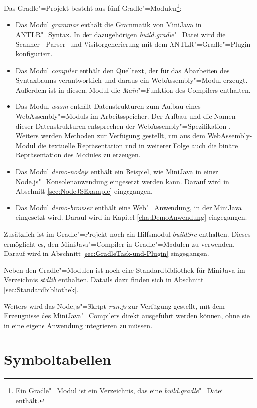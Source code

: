 Das Gradle"=Projekt besteht aus fünf Gradle"=Modulen\footnote{Ein Gradle"=Modul ist ein Verzeichnis, das eine \emph{build.gradle}"=Datei enthält.}:
\begin{itemize}
    \item Das Modul \emph{grammar} enthält die Grammatik von MiniJava in ANTLR"=Syntax. In der dazugehörigen \emph{build.gradle}"=Datei wird die Scanner-, Parser- und Visitorgenerierung mit dem ANTLR"=Gradle"=Plugin konfiguriert.
    \item Das Modul \emph{compiler} enthält den Quelltext, der für das Abarbeiten des Syntaxbaums verantwortlich und daraus ein WebAssembly"=Modul erzeugt. Außerdem ist in diesem Modul die \emph{Main}"=Funktion des Compilers enthalten.
    \item Das Modul \emph{wasm} enthält Datenstrukturen zum Aufbau eines WebAssembly"=Moduls im Arbeitsspeicher. Der Aufbau und die Namen dieser Datenstrukturen entsprechen der WebAssembly"=Spezifikation \cite{WebAssemblySpecification}. Weiters werden Methoden zur Verfügung gestellt, um aus dem WebAssembly-Modul die textuelle Repräsentation und in weiterer Folge auch die binäre Repräsentation des Modules zu erzeugen.
    \item Das Modul \emph{demo-nodejs} enthält ein Beispiel, wie MiniJava in einer Node.js"=Konsolenanwendung eingesetzt werden kann. Darauf wird in Abschnitt \ref{sec:NodeJSExample} eingegangen.
    \item Das Modul \emph{demo-browser} enthält eine Web"=Anwendung, in der MiniJava eingesetzt wird. Darauf wird in Kapitel \ref{cha:DemoAnwendung} eingegangen.
\end{itemize}

Zusätzlich ist im Gradle"=Projekt noch ein Hilfsmodul \emph{buildSrc} enthalten. Dieses ermöglicht es, den MiniJava"=Compiler in Gradle"=Modulen zu verwenden. Darauf wird in Abschnitt \ref{sec:GradleTask-und-Plugin} eingegangen.

Neben den Gradle"=Modulen ist noch eine Standardbibliothek für MiniJava im Verzeichnis \emph{stdlib} enthalten. Datails dazu finden sich in Abschnitt \ref{sec:Standardbibliothek}.

Weiters wird das Node.js"=Skript \emph{run.js} zur Verfügung gestellt, mit dem Erzeugnisse des MiniJava"=Compilers direkt ausgeführt werden können, ohne sie in eine eigene Anwendung integrieren zu müssen.

\section{Symboltabellen}

